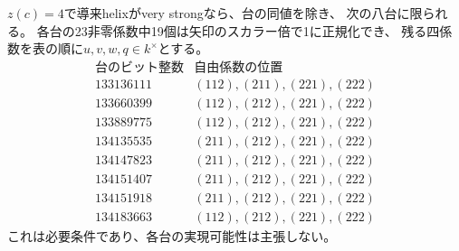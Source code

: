 \begin{theorem}[四零係数型の経路次元による制約]
\label{thm:ou-four-zero-path-exclusion}
$z(c)=4$で導来helixがvery strongなら、台の同値を除き、
次の八台に限られる。
各台の23非零係数中19個は矢印のスカラー倍で1に正規化でき、
残る四係数を表の順に$u,v,w,q\in k^\times$とする。
\[
\begin{array}{r|l}
\text{台のビット整数}&\text{自由係数の位置}\\ \hline
133136111&(112),(211),(221),(222)\\
133660399&(112),(212),(221),(222)\\
133889775&(112),(212),(221),(222)\\
134135535&(211),(212),(221),(222)\\
134147823&(211),(212),(221),(222)\\
134151407&(211),(212),(221),(222)\\
134151918&(211),(212),(221),(222)\\
134183663&(112),(212),(221),(222)
\end{array}
\]
これは必要条件であり、各台の実現可能性は主張しない。
\end{theorem}

